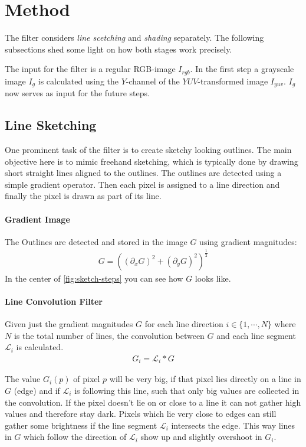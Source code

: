\section{Method} \label{method}
The filter considers \textit{line scetching} and \textit{shading} separately.
The following subsections shed some light on how both stages work precisely.

The input for the filter is a regular RGB-image $I_{rgb}$. In the first step a
grayscale image $I_g$ is calculated using the $Y$-channel of the
$YUV$-transformed image $I_{yuv}$. $I_g$ now serves as input for the future
steps.

\subsection{Line Sketching}
One prominent task of the filter is to create sketchy looking outlines. The main
objective here is to mimic freehand sketching, which is typically done by
drawing short straight lines aligned to the outlines. The outlines are detected
using a simple gradient operator. Then each pixel is assigned to a line
direction and finally the pixel is drawn as part of its line.

\paragraph{Gradient Image}
The Outlines are detected and stored in the image $G$ using gradient magnitudes:
\begin{align*}
  G = ((\partial_x G)^2 + (\partial_y G)^2)^{\frac{1}{2}}
\end{align*}
In the center of \autoref{fig:sketch-steps} you can see how $G$ looks like.

\paragraph{Line Convolution Filter}
Given just the gradient magnitudes $G$ for each line direction $i \in
\lbrace 1,\cdots,N\rbrace$ where $N$ is the total number of lines, the convolution between
$G$ and each line segment $\mathscr{L}_i$ is calculated.
\begin{align}
  G_i = \mathscr{L}_i * G
  \label{eq:Gi}
\end{align}

The value $G_i(p)$ of pixel $p$ will be very big, if that pixel lies directly on
a line in $G$ (edge) and if $\mathscr{L}_i$ is following this line, such that only big
values are collected in the convolution. If the pixel doesn't lie on or close to
a line it can not gather high values and therefore stay dark. Pixels which lie
very close to edges can still gather some brightness if the
line segment $\mathscr{L}_i$ intersects the edge. This way lines in $G$ which
follow the direction of $\mathscr{L}_i$ show up and slightly overshoot in $G_i$.

